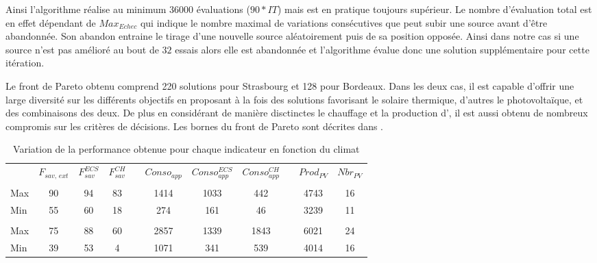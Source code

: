 Ainsi l’algorithme réalise au minimum \num{36000} évaluations ($90 * IT$) mais est
en pratique toujours supérieur.
Le nombre d’évaluation total est en effet dépendant de $Max_{Echec}$ qui indique
le nombre maximal de variations consécutives que peut subir une source avant
d’être abandonnée. Son abandon entraine le tirage d’une nouvelle source aléatoirement
puis de sa position opposée. Ainsi dans notre cas si une source n’est pas amélioré
au bout de $32$ essais alors elle est abandonnée et l’algorithme évalue donc une
solution supplémentaire pour cette itération.



Le front de Pareto obtenu comprend \num{220} solutions pour Strasbourg et
\num{128} pour Bordeaux. Dans les deux cas, il est capable d’offrir une large
diversité sur les différents objectifs en proposant à la fois des solutions
favorisant le solaire thermique, d’autres le photovoltaïque, et des combinaisons
des deux. De plus en considérant de manière disctinctes le chauffage et la production
d’, il est aussi obtenu de nombreux compromis sur les critères de décisions.
Les bornes du front de Pareto sont décrites dans .

\begin{table}
\centering
\caption[Performance maximale pouvant être obtenue pour différents indicateurs]
         {Variation de la performance obtenue pour chaque indicateur en fonction du climat}
\label{tab:bornes_front_pareto}
\begin{tabular}{L{2cm} c c c c c c c c c c}
    \toprule
                & $F_{sav,\,ext}$ & $F_{sav}^{ECS}$ & $F_{sav}^{CH}$ & & $Conso_{app}$ & $Conso_{app}^{ECS}$ & $Conso_{app}^{CH}$ & & $Prod_{PV}$ & $Nbr_{PV}$ \\
    \addlinespace
     \\
    \midrule
    Max & 90  & 94  & 83  &   & 1414  & 1033  & 442 &   & 4743  & 16  \\
    Min & 55  & 60  & 18  &   & 274 & 161 & 46  &   & 3239  & 11  \\
    \addlinespace
     \\
    \midrule
    Max & 75  & 88  & 60  &   & 2857  & 1339  & 1843  &   & 6021  & 24  \\
    Min & 39  & 53  & 4 &   & 1071  & 341 & 539 &   & 4014  & 16  \\
    \bottomrule
\end{tabular}
\end{table}


